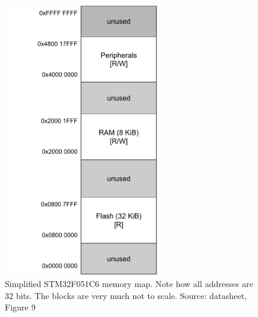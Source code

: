 \begin{figure}
  \centering
  \includegraphics[width=0.6\textwidth]{./week1/memory_model_v0.pdf}
  \caption{Simplified STM32F051C6 memory map. Note how all addresses are 32 bits. The blocks are very much not to scale. Source: datasheet, Figure 9}
  \label{fig:memory_map}
\end{figure}

